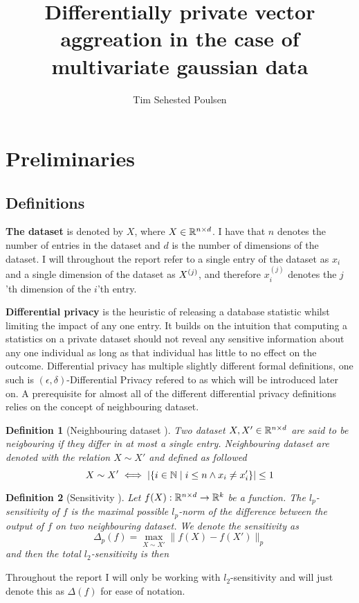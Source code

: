 \documentclass[a4paper,12pt]{article}
\title{Differentially private vector aggreation in the case of multivariate gaussian data}
\author{Tim Sehested Poulsen}
\newtheorem{definition}{Definition}[section]
\begin{document}
\maketitle
{}

\section{Preliminaries}
\subsection{Definitions}

\textbf{The dataset} is denoted by $X$, where 
$X \in \mathbb{R}^{n \times d}$.
I have that $n$ denotes the number of entries in the dataset and 
$d$ is the number of dimensions of the dataset.
I will throughout the report refer to a single entry of 
the dataset as $x_i$ and a single dimension of the dataset as $X^{(j)}$, 
and therefore $x^{(j)}_i$
denotes the $j$'th dimension of the $i$'th entry.
\vspace*{0.3cm}

\textbf{Differential privacy} is the heuristic of 
releasing a database statistic whilst limiting the impact
of any one entry. It builds on the intuition that computing
a statistics on a private dataset should not reveal 
any sensitive information about any one individual 
as long as that individual has little to no effect on the outcome.
Differential privacy has multiple slightly different
formal definitions, 
one such is $(\epsilon, \delta)$-Differential Privacy
refered to as \edp which will be introduced later on.
A prerequisite for almost all of the different differential privacy
definitions relies on the concept of neighbouring dataset.
\vspace*{0.3cm}

\begin{definition}[Neighbouring dataset \cite{dwork2016}]
Two dataset $X, X' \in \mathbb{R}^{n \times d}$ are said to be 
neigbouring if they differ in at most a single entry.
Neighbouring dataset are denoted with the relation $X \sim X'$ and defined as followed
\[ X \sim X' \iff \left | \left \{ i \in \mathbb{N} \; \text{\textbar} \; i \le n \land x_i \ne x_i' \right\} \right| \le 1 \]
\end{definition}

\begin{definition}[Sensitivity \cite{dpbasic}] %
Let $f(X): \mathbb{R}^{n \times d} \rightarrow \mathbb{R}^k$ be a function. 
The $l_p$-sensitivity of $f$ is the maximal 
possible $l_p$-norm of the difference between the output of $f$ 
on two neighbouring dataset.
We denote the sensitivity as 
\[
\Delta_p (f) = \max_{X \sim X'} \| f(X) - f(X') \|_p 
\]
and then the total $l_2$-sensitivity is then
\end{definition}
Throughout the report I will only be working with $l_2$-sensitivity and
will just denote this as $\Delta(f)$ for ease of notation.
    
\end{document}
